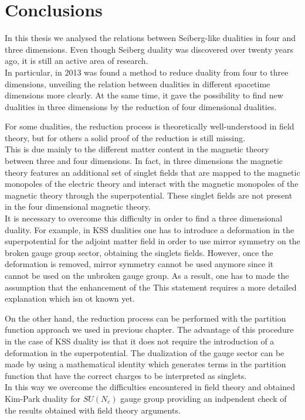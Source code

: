 \chapter*{\bfseries Conclusions}
\pagestyle{conclusion}

In this thesis we analysed the relations between Seiberg-like dualities in four and three dimensions. 
Even though Seiberg duality was discovered over twenty years ago, it is still an active area of research.\\
In particular, in 2013 was found a method to reduce duality from four to three dimensions, unveiling the relation between dualities in different spacetime dimensions more clearly.
At the same time, it gave the possibility to find new dualities in three dimensions by the reduction of four dimensional dualities.

For some dualities, the reduction process is theoretically well-understood in field theory, but for others a solid proof of the reduction is still missing.\\
This is due mainly to the different matter content in the magnetic theory between three and four dimensions.
In fact, in three dimensions the magnetic theory features an additional set of singlet fields that are mapped to the magnetic monopoles of the electric theory and interact with the magnetic monopoles of the magnetic theory through the superpotential.
These singlet fields are not present in the four dimensional magnetic theory.
\\
It is necessary to overcome this difficulty in order to find a three dimensional duality.
For example, in KSS dualities one has to introduce a deformation in the superpotential for the adjoint matter field in order to use mirror symmetry on the broken gauge group sector, obtaining the singlets fields. 
However, once the deformation is removed, mirror symmetry cannot be used anymore since it cannot be used on the unbroken gauge group.
As a result, one has to made the assumption that the enhancement of the 
This statement requires a more detailed explanation which isn
ot known yet.

On the other hand, the reduction process can be performed with the partition function approach we used in previous chapter. 
The advantage of this procedure in the case of KSS duality iss that it does not require the introduction of a deformation in the superpotential.
The dualization of the gauge sector can be made by using a mathematical identity which generates terms in the partition function that have the correct charges to be interpreted as singlets.\\
In this way we overcome the difficulties encountered in field theory and obtained Kim-Park duality for $SU(N_c)$ gauge group providing an indpendent check of the results obtained with field theory arguments.



